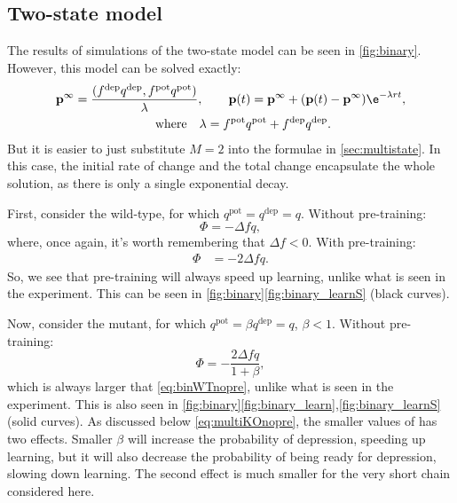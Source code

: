 \documentclass[12pt]{article}
\newcommand{\pr}{\mathbf{p}}
\newcommand{\eq}{\pr^\infty}
\newcommand{\pot}{^{\text{pot}}}
\newcommand{\dep}{^{\text{dep}}}
\begin{document}
\subsection{Two-state model}\label{sec:binary}




The results of simulations of the two-state model can be seen in \autoref{fig:binary}.
However, this model can be solved exactly:
%
\begin{multline}\label{eq:binarysol}
  \eq = \frac{(f\dep q\dep, f\pot q\pot)}{\lambda},
  \qquad
  \pr(t) = \eq + (\pr(t)-\eq)\e^{-\lambda rt},\\
  \qquad \text{where} \quad
  \lambda = f\pot q\pot + f\dep q\dep.
\end{multline}
%
But it is easier to just substitute $M=2$ into the formulae in \autoref{sec:multistate}.
In this case, the initial rate of change and the total change encapsulate the whole solution, as there is only a single exponential decay.

First, consider the wild-type, for which $q\pot=q\dep=q$.
Without pre-training:
%
\begin{equation}\label{eq:binWTnopre}
  \Phi = -\Delta f q,
\end{equation}
%
where, once again, it's worth remembering that $\Delta f<0$.
With pre-training:
%
\begin{equation}\label{eq:binWTpre}
\begin{aligned}
  \Phi &= -2\Delta f q.
\end{aligned}
\end{equation}
%
So, we see that pre-training will always speed up learning, unlike what is seen in the experiment.
This can be seen in \autoref{fig:binary}\ref{fig:binary_learnS} (black curves).

Now, consider the mutant, for which $q\pot=\beta q\dep=q$, $\beta<1$.
Without pre-training:
%
\begin{equation}\label{eq:binKOnopre}
  \Phi = -\frac{2\Delta f q}{1+\beta},
\end{equation}
%
which is always larger that \eqref{eq:binWTnopre}, unlike what is seen in the experiment.
This is also seen in \autoref{fig:binary}\ref{fig:binary_learn},\ref{fig:binary_learnS} (solid curves).
As discussed below \eqref{eq:multiKOnopre}, the smaller values of has two effects.
Smaller $\beta$ will increase the probability of depression, speeding up learning, but it will also decrease the probability of being ready for depression, slowing down learning.
The second effect is much smaller for the very short chain considered here.
\end{document}
